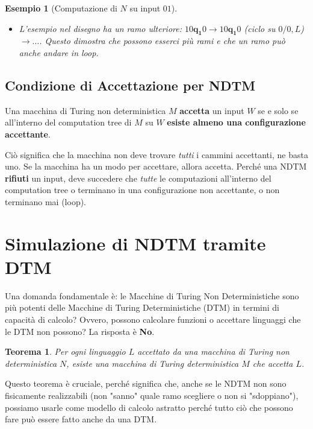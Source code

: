 \documentclass[a4paper]{article}
\newtheorem{theorem}{Teorema}
\newtheorem{example}{Esempio}
\newcommand{\blankS}{\ensuremath{\square}}
\begin{document}
\begin{example}[Computazione di $N$ su input $01$]
\begin{enumerate}
\begin{itemize}
\begin{itemize}
\begin{itemize}
                Da $100\mathbf{q_1}\blankS$: $q_1,\blankS \to (q_2,\blankS,R)$. Scriviamo $\blankS$, spostiamo a destra.\\
                Configurazione successiva: $100\blankS\mathbf{q_2}\blankS$. (Questa è accettante, $q_2 \in F$).
            \end{itemize}
            \item L'esempio nel disegno ha un ramo ulteriore: $10\mathbf{q_1}0 \to 10\mathbf{q_1}0$ (ciclo su $0/0,L$) $\to \dots$. Questo dimostra che possono esserci più rami e che un ramo può anche andare in loop.
        \end{itemize}
    \end{itemize}

\end{enumerate}
\end{example}

\subsection{Condizione di Accettazione per NDTM}

Una macchina di Turing non deterministica $M$ \textbf{accetta} un input $W$ se e solo se all'interno del computation tree di $M$ su $W$ \textbf{esiste almeno una configurazione accettante}.

Ciò significa che la macchina non deve trovare \emph{tutti} i cammini accettanti, ne basta uno. Se la macchina ha un modo per accettare, allora accetta.
Perché una NDTM \textbf{rifiuti} un input, deve succedere che \emph{tutte} le computazioni all'interno del computation tree o terminano in una configurazione non accettante, o non terminano mai (loop).

\section{Simulazione di NDTM tramite DTM}

Una domanda fondamentale è: le Macchine di Turing Non Deterministiche sono più potenti delle Macchine di Turing Deterministiche (DTM) in termini di capacità di calcolo? Ovvero, possono calcolare funzioni o accettare linguaggi che le DTM non possono? La risposta è \textbf{No}.

\begin{theorem}
Per ogni linguaggio $L$ accettato da una macchina di Turing non deterministica $N$, esiste una macchina di Turing deterministica $M$ che accetta $L$.
\end{theorem}
Questo teorema è cruciale, perché significa che, anche se le NDTM non sono fisicamente realizzabili (non "sanno" quale ramo scegliere o non si "sdoppiano"), possiamo usarle come modello di calcolo astratto perché tutto ciò che possono fare può essere fatto anche da una DTM.
\end{document}

